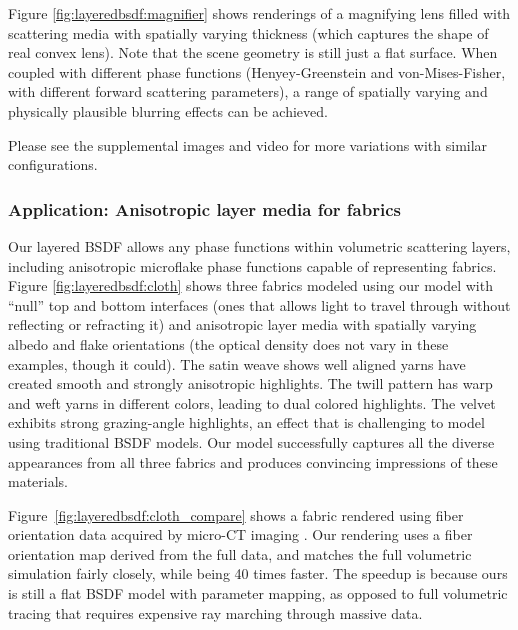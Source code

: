 


Figure \ref{fig:layeredbsdf:magnifier} shows renderings of a magnifying lens filled with scattering media with spatially varying thickness (which captures the shape of real convex lens). Note that the scene geometry is still just a flat surface.
When coupled with different phase functions (Henyey-Greenstein and von-Mises-Fisher, with different forward scattering parameters), a range of spatially varying and physically plausible blurring effects can be achieved.

Please see the supplemental images and video for more variations with similar configurations.

\subsubsection{Application: Anisotropic layer media for fabrics}

Our layered BSDF allows any phase functions within volumetric scattering layers, including anisotropic microflake phase functions \cite{jakob2010radiative,zhao2011building,heitz2015sggx} capable of representing fabrics.
Figure \ref{fig:layeredbsdf:cloth} shows three fabrics modeled using our model with ``null'' top and bottom interfaces (ones that allows light to travel through without reflecting or refracting it) and anisotropic layer media with spatially varying albedo and flake orientations (the optical density does not vary in these examples, though it could).
The satin weave shows well aligned yarns have created smooth and strongly anisotropic highlights. The twill pattern has warp and weft yarns in different colors, leading to dual colored highlights. The velvet exhibits strong grazing-angle highlights, an effect that is challenging to model using traditional BSDF models. Our model successfully captures all the diverse appearances from all three fabrics and produces convincing impressions of these materials.



Figure~\ref{fig:layeredbsdf:cloth_compare} shows a fabric rendered using fiber orientation data acquired by micro-CT imaging \cite{zhao2011building}. Our rendering uses a fiber orientation map derived from the full data, and matches the full volumetric simulation fairly closely, while being 40 times faster. The speedup is because ours is still a flat BSDF model with parameter mapping, as opposed to full volumetric tracing that requires expensive ray marching through massive data.

